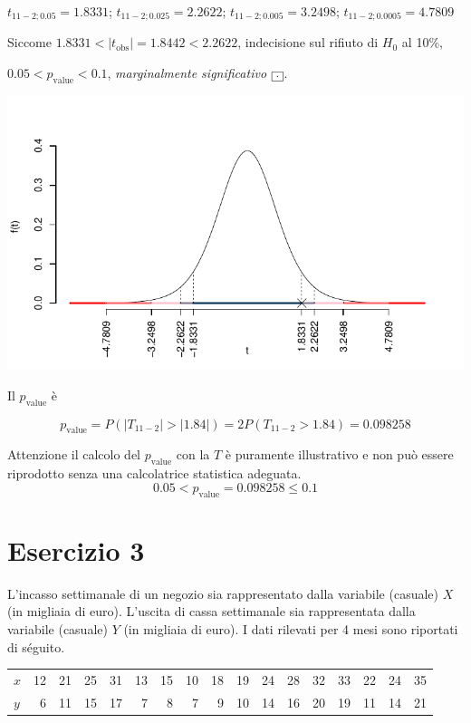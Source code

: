 \documentclass[
  11pt,
]{book}
\theoremstyle{mytheoremstyle}
\theoremstyle{mydefstyle}
\newenvironment{sol}
  {
  \begin{tcolorbox}[enhanced,breakable,arc=0.1mm,boxrule=1pt,colback=white,colframe=iblue,
  title=\bf \fontfamily{lmss}\selectfont \hspace{.5 cm} Soluzione,drop fuzzy shadow]

}{
\end{tcolorbox}
  }
\begin{document}
\begin{sol}
\(t_{11-2;0.05}=1.8331\); \(t_{11-2;0.025}=2.2622\); \(t_{11-2;0.005}=3.2498\); \(t_{11-2;0.0005}=4.7809\)

Siccome \(1.8331<|t_\text{obs}|=1.8442<2.2622\), indecisione sul rifiuto di \(H_0\) al 10\%,

\(0.05<p_\text{value}<0.1\), \emph{marginalmente significativo} \(\fbox{.}\).

\begin{center}\includegraphics{Esami_passati_con_soluzioni_files/figure-latex/06-regr-14,-1} \end{center}

Il \(p_{\text{value}}\) è

\[ p_{\text{value}} = P(|T_{11-2}|>|1.84|)=2P(T_{11-2}>1.84)=0.098258 \]

Attenzione il calcolo del \(p_\text{value}\) con la \(T\) è puramente illustrativo e non può essere riprodotto senza una calcolatrice statistica adeguata.\[
 0.05 < p_\text{value}= 0.098258 \leq 0.1 
\]

\end{sol}

\section{Esercizio 3}\label{esercizio-3-2}

L'incasso settimanale di un negozio sia rappresentato dalla
variabile (casuale) \(X\) (in migliaia di euro).
L'uscita di cassa settimanale sia rappresentata dalla variabile
(casuale) \(Y\) (in migliaia di euro).
I dati rilevati per 4 mesi sono riportati di séguito.

\begin{table}[H]
\centering
\begin{tabular}{lrrrrrrrrrrrrrrrr}
\toprule
$x$ & 12 & 21 & 25 & 31 & 13 & 15 & 10 & 18 & 19 & 24 & 28 & 32 & 33 & 22 & 24 & 35\\
$y$ & 6 & 11 & 15 & 17 & 7 & 8 & 7 & 9 & 10 & 14 & 16 & 20 & 19 & 11 & 14 & 21\\
\bottomrule
\end{tabular}
\end{table}
\end{document}
